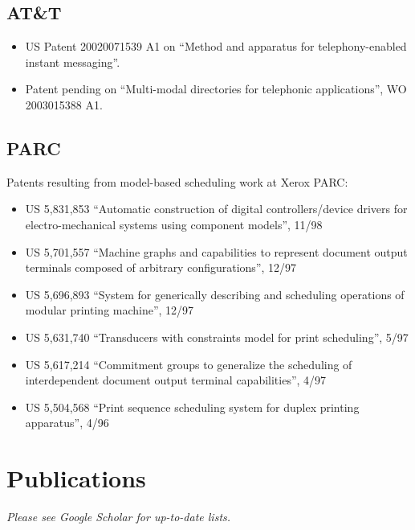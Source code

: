 \documentclass{article}
\begin{document}
\subsection*{AT\&T}
\begin{itemize}
\item US Patent 20020071539 A1 on ``Method and apparatus for telephony-enabled instant messaging''.

\item Patent pending on ``Multi-modal directories for telephonic applications'', WO 2003015388 A1.
\end{itemize}

\subsection*{PARC}
Patents resulting from model-based scheduling work at Xerox PARC:
\begin{itemize}
\item   US 5,831,853  ``Automatic construction of digital
  controllers/device drivers for electro-mechanical systems using
  component models'', 11/98

\item   US 5,701,557 ``Machine graphs and capabilities to represent
  document output terminals composed of arbitrary configurations'', 12/97

\item  US 5,696,893 ``System for generically describing and
  scheduling operations of modular printing machine'', 12/97

\item  US 5,631,740 ``Transducers with constraints model for print
  scheduling'', 5/97

\item  US 5,617,214 ``Commitment groups to generalize the scheduling
  of interdependent document output terminal capabilities'', 4/97

\item  US 5,504,568 ``Print sequence scheduling system for duplex
  printing apparatus'', 4/96
\end{itemize}


\section*{Publications}
{\em Please see Google  Scholar for up-to-date  lists.}
\end{document}
